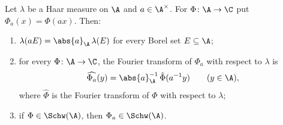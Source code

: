 Let $\lambda$ be a Haar measure on $\A$ and $a\in\A^\times$. For $\Phi\colon\A\to\C$ put $\Phi_a(x)=\Phi(ax)$. Then:
\begin{enumerate}
\item $\lambda(aE)=\abs{a}_\A\,\lambda(E)$ for every Borel set $E\subseteq\A$;
\item for every $\Phi\colon\A\to\C$, the Fourier transform of $\Phi_a$ with respect to $\lambda$ is
  \[
    \widehat{\Phi_a}(y)=\abs{a}_\A^{-1}\,\hat\Phi(a^{-1}y)\qquad(y\in\A),
  \]
  where $\hat\Phi$ is the Fourier transform of $\Phi$ with respect to $\lambda$;
\item if $\Phi\in\Schw(\A)$, then $\Phi_a\in\Schw(\A)$.
\end{enumerate}
